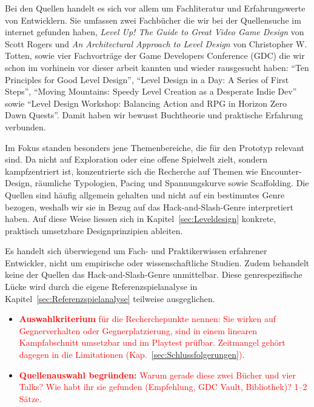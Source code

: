 \documentclass[../Main.tex]{subfiles}
\begin{document}
Bei den Quellen handelt es sich vor allem um Fachliteratur und Erfahrungswerte von Entwicklern. Sie umfassen zwei Fachbücher die wir bei der Quellensuche im internet gefunden haben, \textit{Level Up! The Guide to Great Video Game Design} von Scott Rogers\autocite{rogers2014levelup} und \textit{An Architectural Approach to Level Design} von Christopher W. Totten\autocite{totten2014architectural}, sowie vier Fachvorträge der Game Developers Conference (GDC) die wir schon im vorhinein vor dieser arbeit kannten und wieder rausgesucht haben: \enquote{Ten Principles for Good Level Design}\autocite{gdc_tenprinciples2010}, \enquote{Level Design in a Day: A Series of First Steps}\autocite{gdc_leveldesignaday2020}, \enquote{Moving Mountains: Speedy Level Creation as a Desperate Indie Dev}\autocite{gdc_movingmountains2020} sowie \enquote{Level Design Workshop: Balancing Action and RPG in Horizon Zero Dawn Quests}\autocite{gdc_horizonquests2018}. Damit haben wir bewusst Buchtheorie und praktische Erfahrung verbunden.

Im Fokus standen besonders jene Themenbereiche, die für den Prototyp relevant sind. Da  nicht auf Exploration oder eine offene Spielwelt zielt, sondern kampfzentriert ist, konzentrierte sich die Recherche auf Themen wie Encounter-Design, räumliche Typologien, Pacing und Spannungskurve sowie Scaffolding. Die Quellen sind häufig allgemein gehalten und nicht auf ein bestimmtes Genre bezogen, weshalb wir sie in Bezug auf das Hack-and-Slash-Genre interpretiert haben. Auf diese Weise liessen sich in Kapitel~\ref{sec:Leveldesign} konkrete, praktisch umsetzbare Designprinzipien ableiten.

Es handelt sich überwiegend um Fach- und Praktikerwissen erfahrener Entwickler, nicht um empirische oder wissenschaftliche Studien. Zudem behandelt keine der Quellen das Hack-and-Slash-Genre unmittelbar. Diese genrespezifische Lücke wird durch die eigene Referenzspielanalyse in Kapitel~\ref{sec:Referenzspielanalyse} teilweise ausgeglichen.

\begin{itemize}[leftmargin=1.5cm]
    \item \textcolor{red}{\textbf{Auswahlkriterium} für die Recherchepunkte nennen: Sie wirken auf Gegnerverhalten oder Gegnerplatzierung, sind in einem linearen Kampfabschnitt umsetzbar und im Playtest prüfbar. Zeitmangel gehört dagegen in die Limitationen (Kap.~\ref{sec:Schlussfolgerungen}).}
    \item \textcolor{red}{\textbf{Quellenauswahl begründen:} Warum gerade diese zwei Bücher und vier Talks? Wie habt ihr sie gefunden (Empfehlung, GDC Vault, Bibliothek)? 1--2 Sätze.}
\end{itemize}
\end{document}
